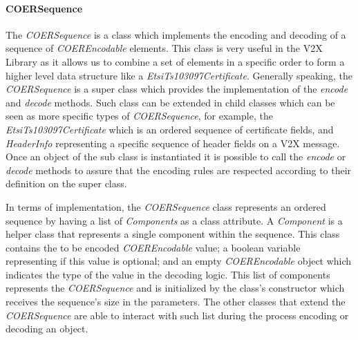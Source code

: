 \paragraph{COERSequence} The \textit{COERSequence} is a class which implements the encoding and decoding of a sequence of \textit{COEREncodable} elements. This class is very useful in the V2X Library as it allows us to combine a set of elements in a specific order to form a higher level data structure like a \textit{EtsiTs103097Certificate}. Generally speaking, the \textit{COERSequence} is a super class which provides the implementation of the \textit{encode} and \textit{decode} methods. Such class can be extended in child classes which can be seen as more specific types of \textit{COERSequence}, for example, the \textit{EtsiTs103097Certificate} which is an ordered sequence of certificate fields, and \textit{HeaderInfo} representing a specific sequence of header fields on a V2X message. Once an object of the sub class is instantiated it is possible to call the \textit{encode} or \textit{decode} methods to assure that the encoding rules are respected according to their definition on the super class. 

In terms of implementation, the \textit{COERSequence} class represents an ordered sequence by having a list of \textit{Components} as a class attribute. A \textit{Component} is a helper class that represents a single component within the sequence. This class contains the to be encoded \textit{COEREncodable} value; a boolean variable representing if this value is optional; and an empty \textit{COEREncodable} object which indicates the type of the value in the decoding logic. This list of components represents the \textit{COERSequence} and is initialized by the class's constructor which receives the sequence's size in the parameters. The other classes that extend the \textit{COERSequence} are able to interact with such list during the process encoding or decoding an object. 


